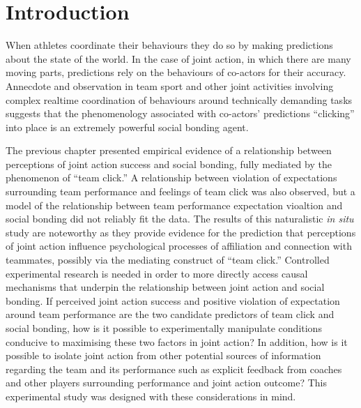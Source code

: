 \documentclass[english]{article}\usepackage[]{graphicx}\usepackage[]{color}
\begin{document}

%



















\section{Introduction}
When athletes coordinate their behaviours they do so by making predictions about the state of the world.  In the case of joint action, in which there are many moving parts, predictions rely on the behaviours of co-actors for their accuracy. Annecdote and observation in team sport and other joint activities involving complex realtime coordination of behaviours around technically demanding tasks suggests that the phenomenology associated with co-actors' predictions ``clicking'' into place is an extremely powerful social bonding agent.

The previous chapter presented empirical evidence of a relationship between perceptions of joint action success and social bonding, fully mediated by the phenomenon of ``team click.'' A relationship between violation of expectations surrounding team performance and feelings of team click was also observed, but a model of the relationship between team performance expectation vioaltion and social bonding did not reliably fit the data.  The results of this naturalistic \textit{in situ} study are noteworthy as they provide evidence for the prediction that perceptions of joint action influence psychological processes of affiliation and connection with teammates, possibly via the mediating construct of ``team click.''  Controlled experimental research is needed in order to more directly access causal mechanisms that underpin the relationship between joint action and social bonding.  If perceived joint action success and positive violation of expectation around team performance are the two candidate predictors of team click and social bonding, how is it possible to experimentally manipulate conditions conducive to maximising these two factors in joint action? In addition, how is it possible to isolate joint action from other potential sources of information regarding the team and its performance such as explicit feedback from coaches and other players surrounding performance and joint action outcome? This experimental study was designed with these considerations in mind.
\end{document}
